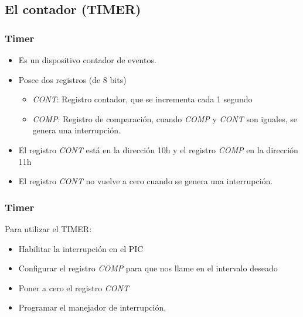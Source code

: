 \documentclass{beamer}
\begin{document}
\subsection{El contador (TIMER)}
\begin{frame}
\frametitle{Timer}
\begin{itemize}
\item Es un dispositivo contador de eventos.
\item Posee dos registros (de 8 bits)
\begin{itemize}
 \item \emph{CONT}: Registro contador, que se incrementa cada 1 segundo
 \item \emph{COMP}: Registro de comparación, cuando \emph{COMP} y \emph{CONT} son iguales, se genera una interrupción.
\end{itemize}
\item El registro \emph{CONT} está en la dirección 10h y el registro \emph{COMP} en la dirección 11h
\item El registro \emph{CONT} no vuelve a cero cuando se genera una interrupción.
\end{itemize}

\end{frame}

\begin{frame}
\frametitle{Timer}
Para utilizar el TIMER:
\begin{itemize}
\item Habilitar la interrupción en el PIC
\item Configurar el registro \emph{COMP} para que nos llame en el intervalo deseado
\item Poner a cero el registro \emph{CONT}
\item Programar el manejador de interrupción.
\end{itemize}

\end{frame}
\end{document}
